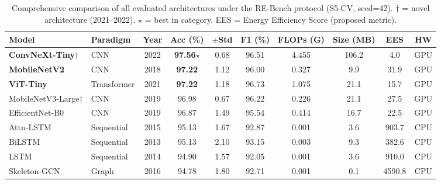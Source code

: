 \begin{table}[htbp]
\centering
\caption{Comprehensive comparison of all evaluated architectures under the RE-Bench protocol (S5-CV, seed=42). $\dagger$ = novel architecture (2021--2022). $\star$ = best in category. EES = Energy Efficiency Score (proposed metric).}
\label{tab:master_comparison}
\begin{tabular}{llcccccccc}
\hline
\textbf{Model} & \textbf{Paradigm} & \textbf{Year} & \textbf{Acc (\%)} & \textbf{$\pm$Std} & \textbf{F1 (\%)} & \textbf{FLOPs (G)} & \textbf{Size (MB)} & \textbf{EES} & \textbf{HW} \\
\hline
\textbf{ConvNeXt-Tiny$\dagger$} & CNN & 2022 & \textbf{97.56$\star$} & 0.68 & 96.51 & 4.455 & 106.2 & 4.0 & GPU \\
\textbf{MobileNetV2} & CNN & 2018 & \textbf{97.22} & 1.12 & 96.00 & 0.327 & 9.9 & 31.9 & GPU \\
\hline
\textbf{ViT-Tiny} & Transformer & 2021 & \textbf{97.22} & 1.18 & 96.73 & 1.075 & 21.1 & 15.7 & GPU \\
\hline
MobileNetV3-Large$\dagger$ & CNN & 2019 & 96.98 & 0.67 & 96.22 & 0.226 & 21.1 & 27.5 & GPU \\
EfficientNet-B0 & CNN & 2019 & 96.87 & 1.49 & 95.54 & 0.414 & 16.7 & 22.5 & GPU \\
\hline
Attn-LSTM & Sequential & 2015 & 95.13 & 1.67 & 92.87 & 0.001 & 3.6 & 903.7 & CPU \\
BiLSTM & Sequential & 2013 & 95.13 & 2.10 & 93.15 & 0.003 & 9.3 & 382.6 & CPU \\
LSTM & Sequential & 2014 & 94.90 & 1.57 & 92.05 & 0.001 & 3.6 & 910.0 & CPU \\
\hline
Skeleton-GCN & Graph & 2016 & 94.78 & 1.80 & 92.71 & 0.001 & 0.1 & 4590.8 & CPU \\
\hline
\end{tabular}
\end{table}